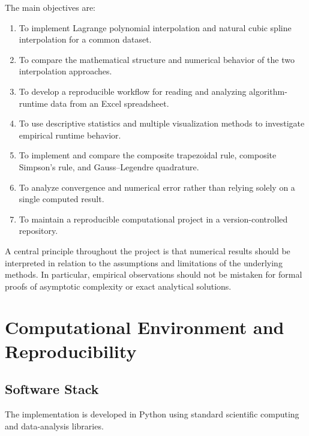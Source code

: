 \documentclass[11pt,a4paper]{article}
\begin{document}
The main objectives are:

\begin{enumerate}
    \item To implement Lagrange polynomial interpolation and natural cubic
    spline interpolation for a common dataset.

    \item To compare the mathematical structure and numerical behavior of
    the two interpolation approaches.

    \item To develop a reproducible workflow for reading and analyzing
    algorithm-runtime data from an Excel spreadsheet.

    \item To use descriptive statistics and multiple visualization methods
    to investigate empirical runtime behavior.

    \item To implement and compare the composite trapezoidal rule,
    composite Simpson's rule, and Gauss--Legendre quadrature.

    \item To analyze convergence and numerical error rather than relying
    solely on a single computed result.

    \item To maintain a reproducible computational project in a
    version-controlled repository.
\end{enumerate}

A central principle throughout the project is that numerical results should
be interpreted in relation to the assumptions and limitations of the
underlying methods. In particular, empirical observations should not be
mistaken for formal proofs of asymptotic complexity or exact analytical
solutions.


\section{Computational Environment and Reproducibility}

\subsection{Software Stack}

The implementation is developed in Python using standard scientific
computing and data-analysis libraries.
\end{document}
